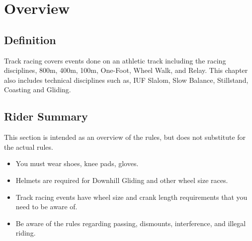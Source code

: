 \chapter{Overview}

\section{Definition}

Track racing covers events done on an athletic track including the racing disciplines, 800m, 400m, 100m, One-Foot, Wheel Walk, and Relay.
This chapter also includes technical disciplines such as, IUF Slalom, Slow Balance, Stillstand, Coasting and Gliding.

\section{Rider Summary}

This section is intended as an overview of the rules, but does not substitute for the actual rules.
\begin{itemize}
\item You must wear shoes, knee pads, gloves.
\item Helmets are required for Downhill Gliding and other wheel size races.
\item Track racing events have wheel size and crank length requirements that you need to be aware of.
\item Be aware of the rules regarding passing, dismounts, interference, and illegal riding.
\end{itemize}
